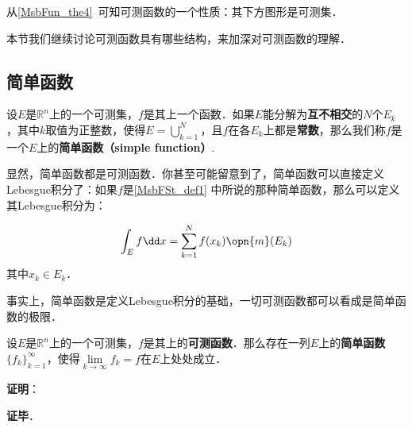 
从\autoref{MsbFun_the4}~可知可测函数的一个性质：其下方图形是可测集．

本节我们继续讨论可测函数具有哪些结构，来加深对可测函数的理解．

\subsection{简单函数}

\begin{definition}{}\label{MsbFSt_def1}
设$E$是$\mathbb{R}^n$上的一个可测集，$f$是其上一个函数．如果$E$能分解为\textbf{互不相交}的$N$个$E_k$，其中$k$取值为正整数，使得$E=\bigcup_{k=1}^N$，且$f$在各$E_k$上都是\textbf{常数}，那么我们称$f$是一个$E$上的\textbf{简单函数（simple function）}.
\end{definition}

显然，简单函数都是可测函数．你甚至可能留意到了，简单函数可以直接定义Lebesgue积分了：如果$f$是\autoref{MsbFSt_def1} 中所说的那种简单函数，那么可以定义其Lebesgue积分为：

\begin{equation}
\int_E f \dd x = \sum_{k=1}^N f(x_k) \opn{m}(E_k)
\end{equation}
其中$x_k\in E_k$．

事实上，简单函数是定义Lebesgue积分的基础，一切可测函数都可以看成是简单函数的极限．

\begin{theorem}{}
设$E$是$\mathbb{R}^n$上的一个可测集，$f$是其上的\textbf{可测函数}．那么存在一列$E$上的\textbf{简单函数}$\{f_k\}_{k=1}^\infty$，使得$\lim\limits_{k\to\infty}f_k=f$在$E$上处处成立．
\end{theorem}

\textbf{证明}：



\textbf{证毕}．






















